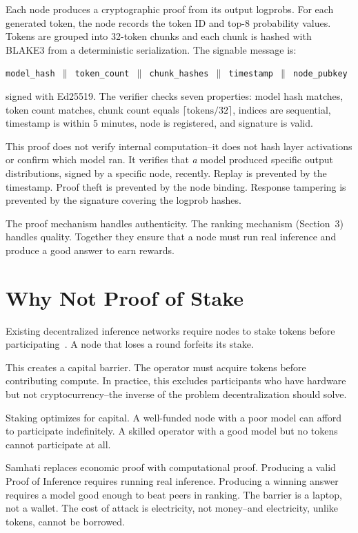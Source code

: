 \documentclass[11pt,a4paper]{article}
\begin{document}
Each node produces a cryptographic proof from its output logprobs. For each generated token, the node records the token ID and top-8 probability values. Tokens are grouped into 32-token chunks and each chunk is hashed with BLAKE3 from a deterministic serialization. The signable message is:

\begin{center}
\texttt{model\_hash $\|$ token\_count $\|$ chunk\_hashes $\|$ timestamp $\|$ node\_pubkey}
\end{center}

signed with Ed25519. The verifier checks seven properties: model hash matches, token count matches, chunk count equals $\lceil\text{tokens}/32\rceil$, indices are sequential, timestamp is within 5 minutes, node is registered, and signature is valid.

This proof does not verify internal computation--it does not hash layer activations or confirm which model ran. It verifies that \textit{a} model produced specific output distributions, signed by a specific node, recently. Replay is prevented by the timestamp. Proof theft is prevented by the node binding. Response tampering is prevented by the signature covering the logprob hashes.

The proof mechanism handles authenticity. The ranking mechanism (Section~3) handles quality. Together they ensure that a node must run real inference and produce a good answer to earn rewards.

\section{Why Not Proof of Stake}

Existing decentralized inference networks require nodes to stake tokens before participating~\cite{fortytwo}. A node that loses a round forfeits its stake.

This creates a capital barrier. The operator must acquire tokens before contributing compute. In practice, this excludes participants who have hardware but not cryptocurrency--the inverse of the problem decentralization should solve.

Staking optimizes for capital. A well-funded node with a poor model can afford to participate indefinitely. A skilled operator with a good model but no tokens cannot participate at all.

Samhati replaces economic proof with computational proof. Producing a valid Proof of Inference requires running real inference. Producing a winning answer requires a model good enough to beat peers in ranking. The barrier is a laptop, not a wallet. The cost of attack is electricity, not money--and electricity, unlike tokens, cannot be borrowed.
\end{document}
